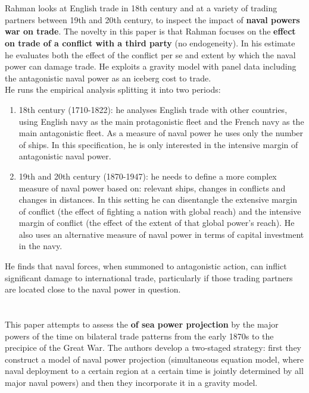 \documentclass[12pt,a4paper,titlepage,english]{article}
\begin{document}
\section*{\cite{rahman2010fighting}}
Rahman looks at English trade in 18th century and at a variety of trading partners between 19th and 20th century, to inspect the impact of \textbf{naval powers war on trade}. The novelty in this paper is that Rahman focuses on the \textbf{effect on trade of a conflict with a third party} (no endogeneity). In his estimate he evaluates both the effect of the conflict per se and extent by which the naval power can damage trade. He exploits a gravity model with panel data including the antagonistic naval power as an iceberg cost to trade. \\
He runs the empirical analysis splitting it into two periods:
\begin{enumerate}
\item{18th century (1710-1822): he analyses English trade with other countries, using English navy as
the main protagonistic fleet and the French navy as the main antagonistic fleet. As a measure of naval power he uses only the number of ships. In this specification, he is only interested in the intensive margin of antagonistic naval power. }
\item{19th and 20th century (1870-1947): he needs to define a more complex measure of naval power based on: relevant ships, changes in conflicts and changes in distances. In this setting he can disentangle the extensive margin of conflict (the effect of fighting a nation with global
reach) and the intensive margin of conflict (the effect of the extent of that global
power’s reach). He also uses an alternative measure of naval power in terms of capital investment in the navy.}
\end{enumerate}
He finds that naval forces, when summoned to antagonistic action, can inflict significant damage to international trade, particularly if those trading partners are located close to the naval power in question.

\section*{\cite{glaser2016ex}}
This paper attempts to assess the \textbf{ of sea power projection} by the major powers of the time on bilateral trade patterns from the early 1870s to the precipice of the Great War.
The authors develop a two-staged strategy: first they construct a model of naval power projection (simultaneous equation model, where naval deployment to a certain region at a certain time is jointly determined by all major naval powers) and then they incorporate it in a gravity model. 
\end{document}
